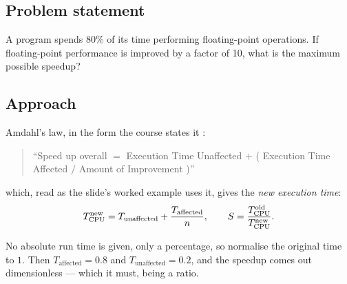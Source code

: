 





\subsection*{Problem statement}

A program spends 80\% of its time performing floating-point operations. If
floating-point performance is improved by a factor of 10, what is the maximum
possible speedup?

\subsection*{Approach}

Amdahl's law, in the form the course states it :

\begin{quote}
``Speed up overall $=$ Execution Time Unaffected $+$ ( Execution Time Affected
$/$ Amount of Improvement )''
\end{quote}

which, read as the slide's worked example uses it, gives the \emph{new
execution time}:
\begin{equation}
  T_{\mathrm{CPU}}^{\text{new}} = T_{\text{unaffected}} + \dfrac{T_{\text{affected}}}{n},
  \qquad
  S = \frac{T_{\mathrm{CPU}}^{\text{old}}}{T_{\mathrm{CPU}}^{\text{new}}}.
  \label{eq:amdahl}
\end{equation}

No absolute run time is given, only a percentage, so normalise the original time
to $1$. Then $T_{\text{affected}} = 0.8$ and $T_{\text{unaffected}} = 0.2$, and
the speedup comes out dimensionless — which it must, being a ratio.

